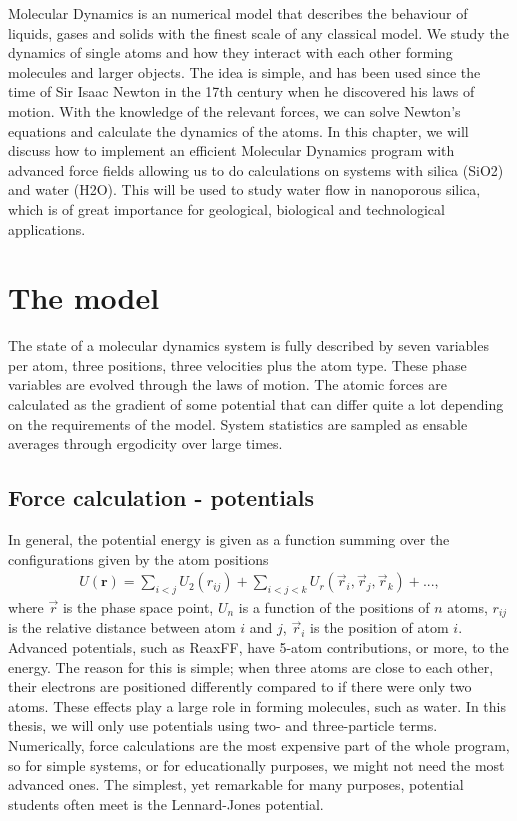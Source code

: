 Molecular Dynamics is an numerical model that describes the behaviour of liquids, gases and solids with the finest scale of any classical model. We study the dynamics of single atoms and how they interact with each other forming molecules and larger objects. The idea is simple, and has been used since the time of Sir Isaac Newton in the 17th century when he discovered his laws of motion. With the knowledge of the relevant forces, we can solve Newton's equations and calculate the dynamics of the atoms. In this chapter, we will discuss how to implement an efficient Molecular Dynamics program with advanced force fields allowing us to do calculations on systems with silica (SiO2) and water (H2O). This will be used to study water flow in nanoporous silica, which is of great importance for geological, biological and technological applications.

\section{The model}
The state of a molecular dynamics system is fully described by seven variables per atom, three positions, three velocities plus the atom type. These phase variables are evolved through the laws of motion. The atomic forces are calculated as the gradient of some potential that can differ quite a lot depending on the requirements of the model. System statistics are sampled as ensable averages through ergodicity over large times. 
\subsection{Force calculation - potentials}
In general, the potential energy is given as a function summing over the configurations given by the atom positions
\begin{align}
	U(\textbf{r}) = \sum_{i<j}U_2(r_{ij}) + \sum_{i<j<k} U_r(\vec r_i, \vec r_j, \vec r_k) + ...,
\end{align}
where $\vec r$ is the phase space point, $U_n$ is a function of the positions of $n$ atoms, $r_{ij}$ is the relative distance between atom $i$ and $j$, $\vec r_i$ is the position of atom $i$. Advanced potentials, such as ReaxFF, have 5-atom contributions, or more, to the energy. The reason for this is simple; when three atoms are close to each other, their electrons are positioned differently compared to if there were only two atoms. These effects play a large role in forming molecules, such as water. In this thesis, we will only use potentials using two- and three-particle terms.\\
Numerically, force calculations are the most expensive part of the whole program, so for simple systems, or for educationally purposes, we might not need the most advanced ones. The simplest, yet remarkable for many purposes, potential students often meet is the Lennard-Jones potential.
